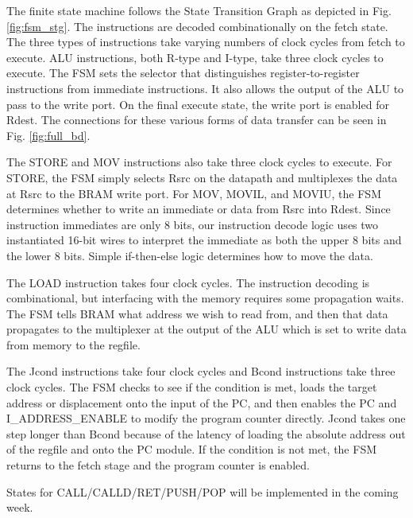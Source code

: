 \documentclass[conference]{IEEEtran}
\begin{document}
The finite state machine follows the State Transition Graph as depicted in Fig. \ref{fig:fsm_stg}. The instructions are decoded combinationally on the fetch state. The three types of instructions take varying numbers of clock cycles from fetch to execute. ALU instructions, both R-type and I-type, take three clock cycles to execute. The FSM sets the selector that distinguishes register-to-register instructions from immediate instructions. It also allows the output of the ALU to pass to the write port. On the final execute state, the write port is enabled for Rdest. The connections for these various forms of data transfer can be seen in Fig. \ref{fig:full_bd}.

The STORE and MOV instructions also take three clock cycles to execute. For STORE, the FSM simply selects Rsrc on the datapath and multiplexes the data at Rsrc to the BRAM write port. For MOV, MOVIL, and MOVIU, the FSM determines whether to write an immediate or data from Rsrc into Rdest. Since instruction immediates are only 8 bits, our instruction decode logic uses two instantiated 16-bit wires to interpret the immediate as both the upper 8 bits and the lower 8 bits. Simple if-then-else logic determines how to move the data. 

The LOAD instruction takes four clock cycles. The instruction decoding is combinational, but interfacing with the memory requires some propagation waits. The FSM tells BRAM what address we wish to read from, and then that data propagates to the multiplexer at the output of the ALU which is set to write data from memory to the regfile.

The Jcond instructions take four clock cycles and Bcond instructions take three clock cycles. The FSM checks to see if the condition is met, loads the target address or displacement onto the input of the PC, and then enables the PC and I\_ADDRESS\_ENABLE to modify the program counter directly. Jcond takes one step longer than Bcond because of the latency of loading the absolute address out of the regfile and onto the PC module. If the condition is not met, the FSM returns to the fetch stage and the program counter is enabled. 

States for CALL/CALLD/RET/PUSH/POP will be implemented in the coming week.
\end{document}
